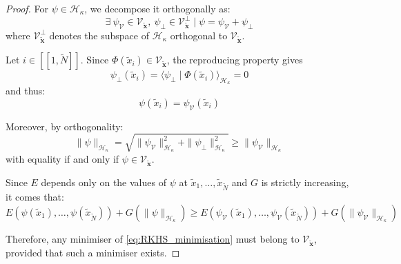 \begin{proof}
	For $\psi\in\mathcal{H}_\kappa$, we decompose it orthogonally as:
	\begin{equation}
		\exists\:\psi_{\mathcal{V}}\in\mathcal{V}_{\tilde{\mathbf{x}}},\:\psi_{\perp}\in\mathcal{V}_{\tilde{\mathbf{x}}}^\perp\mid\psi=\psi_{\mathcal{V}}+\psi_{\perp}
	\end{equation}
	where $\mathcal{V}_{\tilde{\mathbf{x}}}^\perp$ denotes the subspace of $\mathcal{H}_\kappa$ orthogonal to $\mathcal{V}_{\tilde{\mathbf{x}}}$.

	Let $i\in[\![1,\tilde{N}]\!]$. Since $\Phi(\tilde{x}_i)\in\mathcal{V}_{\tilde{\mathbf{x}}}$, the reproducing property gives
	\begin{equation}
		\psi_{\perp}(\tilde{x}_i)=\langle\psi_{\perp}\mid\Phi(\tilde{x}_i)\rangle_{\mathcal{H}_\kappa}=0
	\end{equation}
	and thus:
	\begin{equation}
		\psi(\tilde{x}_i)=\psi_{\mathcal{V}}(\tilde{x}_i)
	\end{equation}

	Moreover, by orthogonality:
	\begin{equation}
		\|\psi\|_{\mathcal{H}_\kappa}=\sqrt{\|\psi_{\mathcal{V}}\|_{\mathcal{H}_\kappa}^2+\|\psi_{\perp}\|_{\mathcal{H}_\kappa}^2}\geq\|\psi_{\mathcal{V}}\|_{\mathcal{H}_\kappa}
	\end{equation}
	with equality if and only if $\psi\in\mathcal{V}_{\tilde{\mathbf{x}}}$.

	Since $E$ depends only on the values of $\psi$ at
	$\tilde{x}_1,\dots,\tilde{x}_{\tilde{N}}$ and $G$ is strictly increasing, it comes that:
	\begin{equation}
		E(\psi(\tilde{x}_1),\dots,\psi(\tilde{x}_{\tilde{N}}))+G(\|\psi\|_{\mathcal{H}_\kappa})\geq E(\psi_{\mathcal{V}}(\tilde{x}_1),\dots,\psi_{\mathcal{V}}(\tilde{x}_{\tilde{N}}))+G(\|\psi_{\mathcal{V}}\|_{\mathcal{H}_\kappa})
	\end{equation}

	Therefore, any minimiser of \eqref{eq:RKHS_minimisation} must belong to $\mathcal{V}_{\tilde{\mathbf{x}}}$, provided that such a minimiser exists.
\end{proof}

